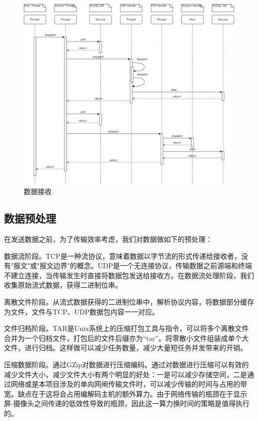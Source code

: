 \begin{figure}[!htbp]
\centering
\includegraphics[scale=0.8]{figures/ST_Recv.png}
\caption{数据接收}
\end{figure}

\subsection{数据预处理}

在发送数据之前，为了传输效率考虑，我们对数据做如下的预处理：

数据流阶段。TCP是一种流协议，意味着数据以字节流的形式传递给接收者，没有"报文"或"报文边界"的概念。UDP是一个无连接协议，传输数据之前源端和终端不建立连接，当传输发生时直接将数据包发送给接收方。在数据流处理阶段，我们收集原始流式数据，获得二进制位串。

离散文件阶段。从流式数据获得的二进制位串中，解析协议内容，将数据部分缓存为文件，文件与TCP、UDP数据包内容一一对应。

文件归档阶段。TAR是Unix系统上的压缩打包工具与指令，可以将多个离散文件合并为一个归档文件，打包后的文件后缀亦为“tar”。将零散小文件组装成单个大文件，进行归档。这样做可以减少任务数量，减少大量短任务并发带来的开销。

压缩数据阶段。通过GZip对数据进行压缩编码。通过对数据进行压缩可以有效的减少文件大小，减少文件大小有两个明显的好处：一是可以减少存储空间，二是通过网络或是本项目涉及的单向网闸传输文件时，可以减少传输的时间与占用的带宽。缺点在于这将会占用编解码主机的额外算力。由于网络传输的瓶颈在于显示屏-摄像头之间传递的低效性导致的瓶颈，因此这一算力换时间的策略是值得执行的。

